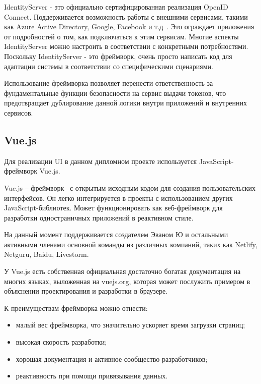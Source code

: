 IdentityServer - это официально сертифицированная реализация OpenID Connect. Поддерживается возможность работы с внешними сервисами, такими как Azure Active Directory, Google, Facebook и т.д~\cite{wiki_idenityserver}. Это ограждает приложения от подробностей о том, как подключаться к этим сервисам. Многие аспекты IdentityServer можно настроить в соответствии с конкретными потребностями. Поскольку IdentityServer - это фреймворк, очень просто написать код для адаптации системы в соответствии со специфическими сценариями. 

Использование фреймворка позволяет перенести ответственность за фундаментальные функции безопасности на сервис выдачи токенов, что предотвращает дублирование данной логики внутри приложений и внутренних сервисов.


\subsection{Vue.js}

Для реализации UI в данном дипломном проекте используется JavaScript-фреймворк Vue.js.

Vue.js – фреймворк~\cite{wiki_vue} с открытым исходным кодом для создания пользовательских интерфейсов. Он легко интегрируется в проекты с использованием других JavaScript-библиотек. Может функционировать как веб-фреймворк для разработки одностраничных приложений в реактивном стиле.

На данный момент поддерживается создателем Эваном Ю и остальными активными членами основной команды из различных компаний, таких как Netlify, Netguru, Baidu, Livestorm.

У Vue.js есть собственная официальная достаточно богатая документация на многих языках, выложенная на vuejs.org, которая может послужить примером в объяснении проектирования и разработки в браузере. 

К преимуществам фреймворка можно отнести:
\begin{itemize}
    \item малый вес фреймворка, что значительно ускоряет время загрузки страниц;
    \item высокая скорость разработки;
    \item хорошая документация и активное сообщество разработчиков;
    \item реактивность при помощи привязывания данных.
\end{itemize}

